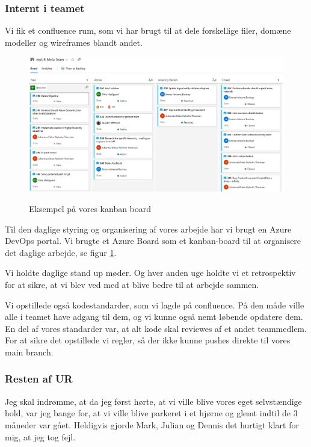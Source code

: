 \documentclass[a4paper]{article}
\begin{document}
\subsubsection{Internt i teamet}
Vi fik et confluence rum, som vi har brugt til at dele forskellige filer, 
domæne modeller og wireframes blandt andet.

\begin{figure}[ht!]
    \includegraphics[width=\linewidth]{kanbanboard.png}
    \centering
    \label{kanban}
    \caption{Eksempel på vores kanban board}
\end{figure}

Til den daglige styring og organisering af vores arbejde
har vi brugt en Azure DevOps portal.
Vi brugte et Azure Board som et kanban-board
til at organisere det daglige arbejde, se figur \ref{kanban}.

Vi holdte daglige stand up møder.
Og hver anden uge holdte vi et retrospektiv for at sikre,
at vi blev ved med at blive bedre til at arbejde sammen.

Vi opstillede også kodestandarder, som vi lagde på confluence.
På den måde ville alle i teamet have adgang til dem,
og vi kunne også nemt løbende opdatere dem.
En del af vores standarder var,
at alt kode skal reviewes af et andet teammedlem.
For at sikre det opstillede vi regler,
så der ikke kunne pushes direkte til vores main branch.

\subsubsection{Resten af UR}
Jeg skal indrømme, at da jeg først hørte,
at vi ville blive vores eget selvstændige hold,
var jeg bange for,
at vi ville blive parkeret i et hjørne og glemt indtil de 3 måneder var gået.
Heldigvis gjorde Mark, Julian og Dennis det hurtigt klart for mig,
at jeg tog fejl.
\end{document}
